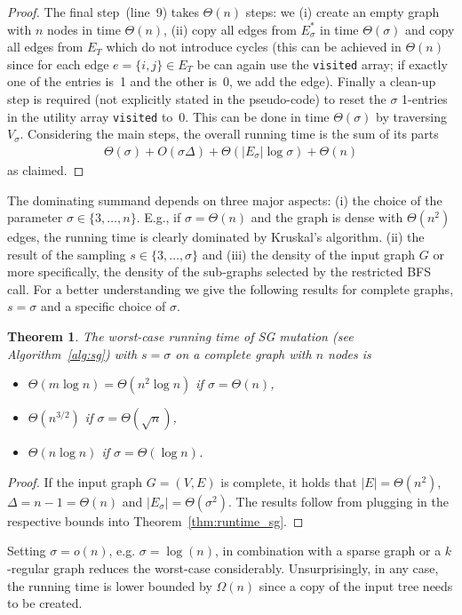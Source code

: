 \documentclass[twoside]{article}
\newtheorem{theorem}{Theorem}
\newtheorem{proof}{Proof}
\begin{document}
\begin{proof}
The final step~(line~9) takes $\Theta(n)$ steps: we (i) create an empty graph with $n$ nodes in time $\Theta(n)$, (ii) copy all edges from $E_{\sigma}^{*}$ in time $\Theta(\sigma)$ and copy all edges from $E_T$ which do not introduce cycles (this can be achieved in $\Theta(n)$ since for each edge $e = \{i,j\} \in E_T$ be can again use the \verb+visited+ array; if exactly one of the entries is~1 and the other is~0, we add the edge). Finally a clean-up step is required (not explicitly stated in the pseudo-code) to reset the $\sigma$ 1-entries in the utility array \verb+visited+ to~0. This can be done in time $\Theta(\sigma)$ by traversing $V_{\sigma}$.
Considering the main steps, the overall running time is the sum of its parts
\begin{align*}
    \Theta(\sigma) + O(\sigma\Delta) + \Theta(|E_{\sigma}|\log \sigma) + \Theta(n)
\end{align*}
as claimed.
\end{proof}
The dominating summand depends on three major aspects: (i) the choice of the parameter $\sigma \in \{3, \ldots, n\}$. E.g., if $\sigma=\Theta(n)$ and the graph is dense with $\Theta(n^2)$ edges, the running time is clearly dominated by Kruskal's algorithm. (ii) the result of the sampling $s \in \{3, \ldots, \sigma\}$ and (iii) the density of the input graph $G$ or more specifically, the density of the sub-graphs selected by the restricted BFS call. For a better understanding we give the following results for complete graphs, $s = \sigma$ and a specific choice of $\sigma$.

\begin{theorem}
\label{thm:runtime_sg_finegrained}
The worst-case running time of SG mutation (see Algorithm~\ref{alg:sg}) with $s = \sigma$ on a complete graph with $n$ nodes is
\begin{itemize}
    \item $\Theta(m \log n) = \Theta(n^2\log n)$ if $\sigma = \Theta(n)$,
    \item $\Theta(n^{3/2})$ if $\sigma = \Theta(\sqrt{n})$,
    \item $\Theta(n \log n)$ if $\sigma = \Theta(\log n)$.
\end{itemize}
\end{theorem}
\begin{proof}
If the input graph $G=(V,E)$ is complete, it holds that $|E| = \Theta(n^2)$, $\Delta = n-1 = \Theta(n)$ and $|E_{\sigma}| = \Theta(\sigma^2)$. The results follow from plugging in the respective bounds into Theorem~\ref{thm:runtime_sg}.
\end{proof}
Setting $\sigma = o(n)$, e.g. $\sigma = \log(n)$, in combination with a sparse graph or a $k$-regular graph reduces the worst-case considerably. Unsurprisingly, in any case, the running time is lower bounded by $\Omega(n)$ since a copy of the input tree needs to be created.
\end{document}
